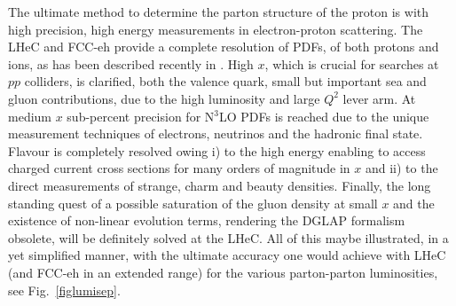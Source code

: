 The ultimate method to determine the parton structure of the proton is with high precision, high energy measurements in electron-proton
scattering. The LHeC and FCC-eh provide a complete resolution of PDFs, of both protons and ions,  as has been described recently in \cite{Ides159,Klein:2018rhq}. High $x$, which is crucial for searches at $pp$ colliders, is clarified, both the valence quark, small but important sea and gluon contributions, due to the high luminosity and large $Q^2$ lever arm. At medium $x$ sub-percent precision for N$^3$LO PDFs is reached due to the unique measurement techniques of electrons, neutrinos and the hadronic final state. Flavour is completely resolved owing i) to the high energy enabling to access charged current cross sections for many orders of magnitude in $x$ and
ii) to the direct measurements of strange, charm and beauty densities. Finally, the long standing quest of a possible saturation of the gluon density at small $x$ and the existence of non-linear evolution terms, rendering the DGLAP formalism obsolete, will be definitely solved at the LHeC. All of this maybe illustrated, in a yet simplified manner, with the ultimate accuracy one would achieve with LHeC (and FCC-eh in an extended range) for the various parton-parton luminosities, see
Fig.~\ref{figlumisep}.
